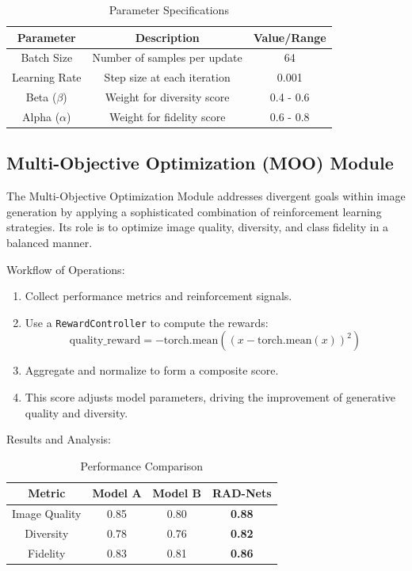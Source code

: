 \documentclass{article} %
\begin{document}
\begin{table}[h]
\centering
\begin{tabular}{|c|c|c|}
\hline
\textbf{Parameter} & \textbf{Description} & \textbf{Value/Range} \\ \hline
Batch Size & Number of samples per update & 64 \\ \hline
Learning Rate & Step size at each iteration & 0.001 \\ \hline
Beta (\(\beta\)) & Weight for diversity score & 0.4 - 0.6 \\ \hline
Alpha (\(\alpha\)) & Weight for fidelity score & 0.6 - 0.8 \\ \hline
\end{tabular}
\caption{Parameter Specifications}
\end{table}

\subsection{Multi-Objective Optimization (MOO) Module}

The Multi-Objective Optimization Module addresses divergent goals within image generation by applying a sophisticated combination of reinforcement learning strategies. Its role is to optimize image quality, diversity, and class fidelity in a balanced manner.

Workflow of Operations:
\begin{enumerate}
    \item Collect performance metrics and reinforcement signals.
    \item Use a \texttt{RewardController} to compute the rewards:
    \[
    \text{quality\_reward} = -\text{torch.mean}\left((x - \text{torch.mean}(x))^2\right)
    \]
    \item Aggregate and normalize to form a composite score.
    \item This score adjusts model parameters, driving the improvement of generative quality and diversity.
\end{enumerate}

Results and Analysis:

\begin{table}[h]
\centering
\begin{tabular}{|c|c|c|c|}
\hline
\textbf{Metric} & \textbf{Model A} & \textbf{Model B} & \textbf{RAD-Nets} \\ \hline
Image Quality & 0.85 & 0.80 & \textbf{0.88} \\ \hline
Diversity & 0.78 & 0.76 & \textbf{0.82} \\ \hline
Fidelity & 0.83 & 0.81 & \textbf{0.86} \\ \hline
\end{tabular}
\caption{Performance Comparison}
\end{table}
\end{document}
